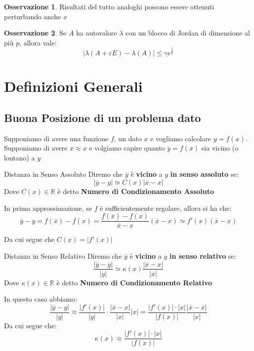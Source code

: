 \documentclass[11pt,a4paper,twoside]{article}
\newcommand{\vareps}{\varepsilon}
\theoremstyle{definition}
\newtheorem*{oss}{Osservazione}
\begin{document}
\begin{oss}
	Risultati del tutto analoghi possono essere ottenuti perturbando anche $x$
\end{oss}

\begin{oss}
	Se $A$ ha autovalore $\lambda$ con un blocco di Jordan di dimensione al più $p$, allora vale:
	\[ |\lambda(A + \vareps E) - \lambda(A)| \leq \gamma e^{\frac 1p}\]
\end{oss}

\newpage

\section{Definizioni Generali}
\subsection{Buona Posizione di un problema dato}

Supponiamo di avere una funzione $f$, un dato $x$ e vogliamo calcolare $y = f(x)$.\\
Supponiamo di avere $\overline x \approx x$ e volgiamo capire quanto $\overline y = f(\overline x)$ sia vicino (o lontano) a $y$

\begin{defn}{Distanza in Senso Assoluto}{}
	Diremo che $\overline y$ è \textbf{vicino} a $y$ \textbf{in senso assoluto} se:
	\[ |\overline y - y| \simeq C(x)|\overline x - x| \]
	Dove $C(x) \in \mathbb R$ è detto \textbf{Numero di Condizionamento Assoluto}
\end{defn}

In prima approssimazione, se $f$ è sufficientemente regolare, allora si ha che:
\[\overline y - y = f(\overline x)- f(x) = \frac{f(\overline x) - f(x)}{\overline x - x}(\overline x - x) \simeq f'(x)(\overline x - x)\]

Da cui segue che $C(x) = |f'(x)|$

\begin{defn}{Distanza in Senso Relativo}{}
	Diremo che $\overline y$ è \textbf{vicino} a $y$ \textbf{in senso relativo} se:
	\[ \frac{|\overline y - y|}{|y|} \simeq \kappa(x) \frac{|\overline x - x|}{|x |} \]
	Dove $\kappa(x) \in \mathbb R$ è detto \textbf{Numero di Condizionamento Relativo}
\end{defn}

In questo caso abbiamo:
\[\frac{|\overline y -y|}{|y|} \approx \frac{|f'(x)|}{|y|}\cdot \frac{|\overline x - x|}{|x|}|x| = \frac{|f'(x)| \cdot |x|}{|f(x)|} \frac{|\overline x - x|}{|x|}\]
Da cui segue che:
\[\kappa(x) \approx \frac{|f'(x)|\cdot |x|}{|f(x)|}\]
\end{document}
